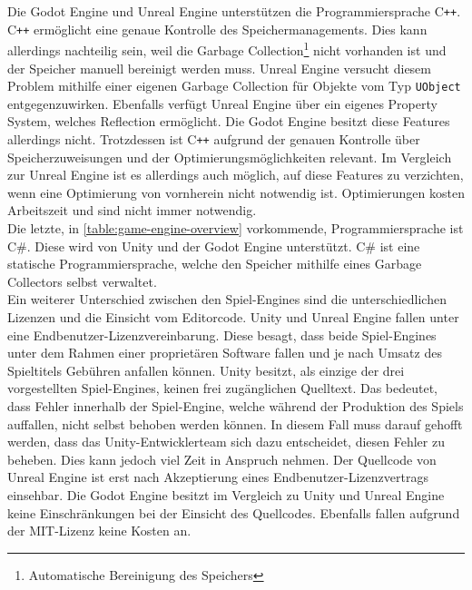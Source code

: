 Die Godot Engine und Unreal Engine unterstützen die Programmiersprache C\texttt{++}. C\texttt{++} ermöglicht eine genaue Kontrolle des Speichermanagements. Dies kann allerdings nachteilig sein, weil die Garbage Collection\footnote{Automatische Bereinigung des Speichers} nicht vorhanden ist und der Speicher manuell bereinigt werden muss. Unreal Engine versucht diesem Problem mithilfe einer eigenen Garbage Collection für Objekte vom Typ \texttt{UObject} entgegenzuwirken\cite{unreal-garbage}. Ebenfalls verfügt Unreal Engine über ein eigenes Property System, welches Reflection ermöglicht\cite{unreal-reflection}. Die Godot Engine besitzt diese Features allerdings nicht. Trotzdessen ist C\texttt{++} aufgrund der genauen Kontrolle über Speicherzuweisungen und der Optimierungsmöglichkeiten relevant. Im Vergleich zur Unreal Engine ist es allerdings auch möglich, auf diese Features zu verzichten, wenn eine Optimierung von vornherein nicht notwendig ist. Optimierungen kosten Arbeitszeit und sind nicht immer notwendig.\\

Die letzte, in \autoref{table:game-engine-overview} vorkommende, Programmiersprache ist C\#. Diese wird von Unity und der Godot Engine unterstützt. C\# ist eine statische Programmiersprache, welche den Speicher mithilfe eines Garbage Collectors selbst verwaltet.\\

Ein weiterer Unterschied zwischen den Spiel-Engines sind die unterschiedlichen Lizenzen und die Einsicht vom Editorcode. Unity und Unreal Engine fallen unter eine Endbenutzer-Lizenzvereinbarung. Diese besagt, dass beide Spiel-Engines unter dem Rahmen einer proprietären Software fallen und je nach Umsatz des Spieltitels Gebühren anfallen können\cite{unity-price}\cite{unreal-price}. Unity besitzt, als einzige der drei vorgestellten Spiel-Engines, keinen frei zugänglichen Quelltext. Das bedeutet, dass Fehler innerhalb der Spiel-Engine, welche während der Produktion des Spiels auffallen, nicht selbst behoben werden können. In diesem Fall muss darauf gehofft werden, dass das Unity-Entwicklerteam sich dazu entscheidet, diesen Fehler zu beheben. Dies kann jedoch viel Zeit in Anspruch nehmen. Der Quellcode von Unreal Engine ist erst nach Akzeptierung eines Endbenutzer-Lizenzvertrags einsehbar. Die Godot Engine besitzt im Vergleich zu Unity und Unreal Engine keine Einschränkungen bei der Einsicht des Quellcodes. Ebenfalls fallen aufgrund der MIT-Lizenz keine Kosten an. \\

